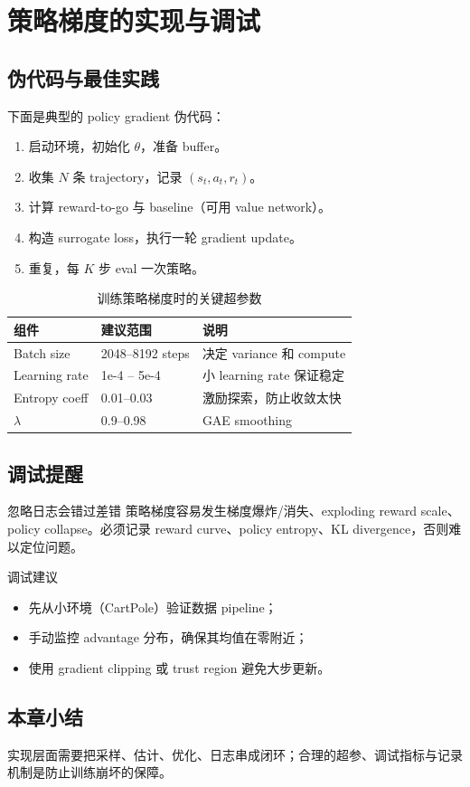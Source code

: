 \section{策略梯度的实现与调试}
\subsection{伪代码与最佳实践}
下面是典型的 policy gradient 伪代码：
\begin{enumerate}
    \item 启动环境，初始化 $\theta$，准备 buffer。
    \item 收集 $N$ 条 trajectory，记录 $(s_t,a_t,r_t)$。
    \item 计算 reward-to-go 与 baseline（可用 value network）。
    \item 构造 surrogate loss，执行一轮 gradient update。
    \item 重复，每 $K$ 步 eval 一次策略。
\end{enumerate}

\begin{table}[H]
\centering
\small
\begin{tabular}{p{}p{}p{}}
\toprule
组件 & 建议范围 & 说明 \\
\midrule
Batch size & 2048--8192 steps & 决定 variance 和 compute \\
Learning rate & 1e-4 -- 5e-4 & 小 learning rate 保证稳定 \\
Entropy coeff & 0.01--0.03 & 激励探索，防止收敛太快 \\
$\lambda$ & 0.9--0.98 & GAE smoothing \\
\bottomrule
\end{tabular}
\caption{训练策略梯度时的关键超参数}
\end{table}

\subsection{调试提醒}
\begin{warningbox}{忽略日志会错过差错}
策略梯度容易发生梯度爆炸/消失、exploding reward scale、policy collapse。必须记录 reward curve、policy entropy、KL divergence，否则难以定位问题。
\end{warningbox}

\begin{importantbox}{调试建议}
\begin{itemize}
    \item 先从小环境（CartPole）验证数据 pipeline；
    \item 手动监控 advantage 分布，确保其均值在零附近；
    \item 使用 gradient clipping 或 trust region 避免大步更新。
\end{itemize}
\end{importantbox}

\subsection{本章小结}
实现层面需要把采样、估计、优化、日志串成闭环；合理的超参、调试指标与记录机制是防止训练崩坏的保障。

